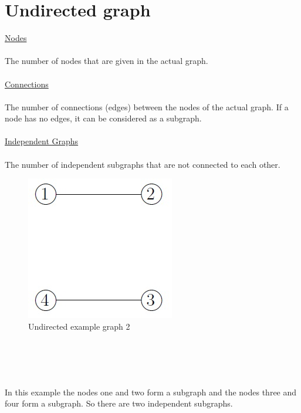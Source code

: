\documentclass[12pt]{report}
\begin{document}
\section{Undirected graph}
\underline{Nodes}\\
\\
The number of nodes that are given in the actual graph.\\
\\
\underline{Connections}\\
\\
The number of connections (edges) between the nodes of the actual graph. If a node has no edges, it can be considered as a subgraph.\\
\\
\underline{Independent Graphs}\\
\\
The number of independent subgraphs that are not connected to each other.\\
\begin{figure}[h]
\centering
\includegraphics[scale=.6]{graph2}
\caption{Undirected example graph 2}
\label{FIG:abb44}
\end{figure}
\\
\\
\\
\\
In this example the nodes one and two form a subgraph and the nodes three and four form a subgraph. So there are two independent subgraphs.\\
\end{document}
